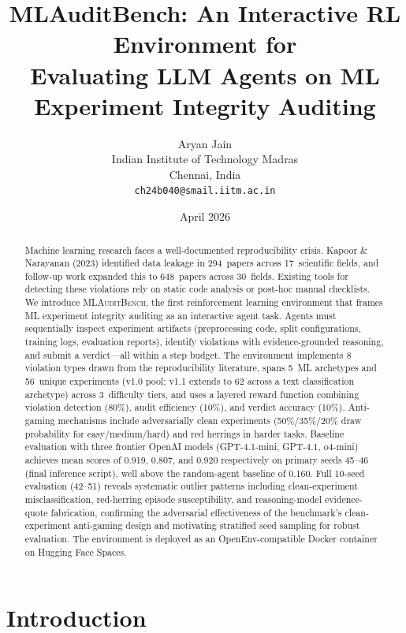 \documentclass{article}
\title{\textbf{MLAuditBench}: An Interactive RL Environment for\\
Evaluating LLM Agents on ML Experiment Integrity Auditing}
\author{
Aryan Jain\\
Indian Institute of Technology Madras\\
Chennai, India\\
\texttt{ch24b040@smail.iitm.ac.in}
}
\date{April 2026}
\begin{document}
\maketitle

\begin{abstract}
Machine learning research faces a well-documented reproducibility crisis.
Kapoor \& Narayanan (2023) identified data leakage in 294~papers across
17~scientific fields, and follow-up work expanded this to 648~papers across
30~fields.  Existing tools for detecting these violations rely on static
code analysis or post-hoc manual checklists.  We introduce
\textsc{MLAuditBench}, the first reinforcement learning environment that
frames ML experiment integrity auditing as an interactive agent task.
Agents must sequentially inspect experiment artifacts (preprocessing code,
split configurations, training logs, evaluation reports), identify
violations with evidence-grounded reasoning, and submit a verdict---all
within a step budget.  The environment implements 8 violation types drawn
from the reproducibility literature, spans 5~ML archetypes and 56~unique experiments (v1.0 pool; v1.1 extends to 62 across a text classification archetype) across 3~difficulty tiers, and uses a layered reward function
combining violation detection (80\%), audit efficiency (10\%), and verdict
accuracy (10\%).  Anti-gaming mechanisms include adversarially clean
experiments (50\%/35\%/20\% draw probability for easy/medium/hard) and red herrings in harder tasks.
Baseline evaluation with three frontier OpenAI models (GPT-4.1-mini, GPT-4.1, o4-mini)
achieves mean scores of 0.919, 0.807, and 0.920 respectively on primary seeds 45--46
(final inference script), well above the random-agent baseline of 0.160.
Full 10-seed evaluation (42--51) reveals systematic outlier patterns including
clean-experiment misclassification, red-herring episode susceptibility, and reasoning-model
evidence-quote fabrication, confirming the adversarial effectiveness of the benchmark's
clean-experiment anti-gaming design and motivating stratified seed sampling for robust evaluation.
The environment is deployed as an OpenEnv-compatible Docker container on
Hugging Face Spaces.
\end{abstract}

\section{Introduction}
\label{sec:intro}
\end{document}
